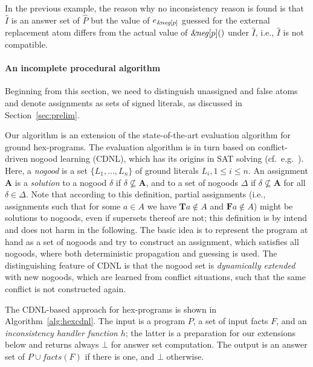 \documentclass[11pt,fleqn,twoside]{article}
\newcommand\hex{{\sc hex}\xspace}
\newcommand{\amp}[1]{\ensuremath{\text{\textsl{{\&}}}\!\mathit{#1}}}
\newcommand{\ext}[3]{\ensuremath{\amp{#1}[#2](#3)}}
\newcommand{\T}{\mathbf{T}}
\newcommand{\F}{\mathbf{F}}
\newcommand{\Assignment}{\ensuremath{\mathbf{A}}}
\newcommand{\Program}{\ensuremath{P}}
\newcommand{\toFacts}[1]{\mathit{facts}(#1)}
\begin{document}
				In the previous example, the reason why no inconsistency reason is found is that $\hat{I}$ is an answer set of $\hat{P}$ but the value of
				$e_{\amp{\mathit{neg}}[p]}$ guessed for the external replacement atom
				differs from the actual value of $\ext{\mathit{neg}}{p}{}$ under $\hat{I}$, i.e., $\hat{I}$ is not compatible.

			\paragraph{An incomplete procedural algorithm}

				Beginning from this section, we need to distinguish unassigned and false atoms
				and denote assignments as sets of signed literals, as discussed in Section~\ref{sec:prelim}.
				
				Our algorithm is an extension of the
				state-of-the-art evaluation algorithm for ground \hex-programs.
				The evaluation algorithm is in turn based on conflict-driven nogood learning (CDNL),
				which has its origins in SAT solving (cf.~e.g.~).
				Here, a \emph{nogood} is a set $\{ L_1, \dotsc, L_n \}$ of ground literals
				$L_i, 1 \le i \le n$.
				An assignment $\Assignment$ is a \emph{solution} to a nogood $\delta$
				if $\delta \not\subseteq \Assignment$,
				and to a set of nogoods $\Delta$ if $\delta \not\subseteq \Assignment$ for all $\delta \in \Delta$.
				Note that according to this definition, partial assignments (i.e., assignments such that for some $a \in A$ we have $\T a \not\in A$ and $\F a \not\in A$)
				might be solutions to nogoods, even if supersets thereof are not; this definition is by intend and does not harm in the following.
				The basic idea is to represent the program at hand as a set of nogoods and try to construct an assignment, which satisfies all nogoods,
				where both deterministic propagation and guessing is used. The distinguishing feature of CDNL is that the nogood set is \emph{dynamically extended}
				with new nogoods, which are learned from conflict situations, such that the same conflict is not constructed again.

				The CDNL-based approach for \hex-programs is shown in Algorithm~\ref{alg:hexcdnl}.
				The input is a program $\Program$, a set of input facts $F$,
				and an \emph{inconsistency handler function} $h$; the latter is a preparation for our extensions below and returns always $\bot$ for answer set computation.
				The output is an answer set of $\Program \cup \toFacts{F}$ if there is one, and $\bot$ otherwise.
\end{document}
